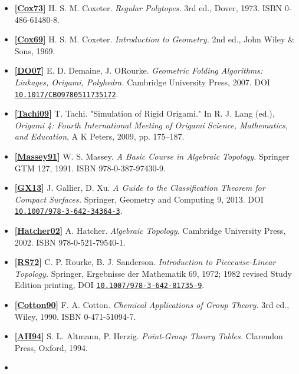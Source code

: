\documentclass[
  11pt,
  a4paper,
]{article}
\providecommand{\tightlist}{%
  \setlength{\itemsep}{0pt}\setlength{\parskip}{0pt}}
\newcommand{\paperdoi}[1]{\begingroup\urlstyle{same}\href{https://doi.org/#1}{\nolinkurl{#1}}\endgroup}
\begin{document}
\begin{itemize}
\tightlist
\item
  \hypertarget{ref-Cox73}{}\textbf{{[}\hyperlink{ref-Cox73}{Cox73}{]}} H. S. M. Coxeter. \emph{Regular Polytopes.} 3rd ed., Dover, 1973. ISBN 0-486-61480-8.
\item
  \hypertarget{ref-Cox69}{}\textbf{{[}\hyperlink{ref-Cox69}{Cox69}{]}} H. S. M. Coxeter. \emph{Introduction to Geometry.} 2nd ed., John Wiley \& Sons, 1969.
\item
  \hypertarget{ref-DO07}{}\textbf{{[}\hyperlink{ref-DO07}{DO07}{]}} E. D. Demaine, J. O\textquotesingle Rourke. \emph{Geometric Folding Algorithms: Linkages, Origami, Polyhedra.} Cambridge University Press, 2007. DOI \paperdoi{10.1017/CBO9780511735172}.
\item
  \hypertarget{ref-Tachi09}{}\textbf{{[}\hyperlink{ref-Tachi09}{Tachi09}{]}} T. Tachi. "Simulation of Rigid Origami." In R. J. Lang (ed.), \emph{Origami 4: Fourth International Meeting of Origami Science, Mathematics, and Education}, A K Peters, 2009, pp. 175--187.
\item
  \hypertarget{ref-Massey91}{}\textbf{{[}\hyperlink{ref-Massey91}{Massey91}{]}} W. S. Massey. \emph{A Basic Course in Algebraic Topology.} Springer GTM 127, 1991. ISBN 978-0-387-97430-9.
\item
  \hypertarget{ref-GX13}{}\textbf{{[}\hyperlink{ref-GX13}{GX13}{]}} J. Gallier, D. Xu. \emph{A Guide to the Classification Theorem for Compact Surfaces.} Springer, Geometry and Computing 9, 2013. DOI \paperdoi{10.1007/978-3-642-34364-3}.
\item
  \hypertarget{ref-Hatcher02}{}\textbf{{[}\hyperlink{ref-Hatcher02}{Hatcher02}{]}} A. Hatcher. \emph{Algebraic Topology.} Cambridge University Press, 2002. ISBN 978-0-521-79540-1.
\item
  \hypertarget{ref-RS72}{}\textbf{{[}\hyperlink{ref-RS72}{RS72}{]}} C. P. Rourke, B. J. Sanderson. \emph{Introduction to Piecewise-Linear Topology.} Springer, Ergebnisse der Mathematik 69, 1972; 1982 revised Study Edition printing, DOI \paperdoi{10.1007/978-3-642-81735-9}.
\item
  \hypertarget{ref-Cotton90}{}\textbf{{[}\hyperlink{ref-Cotton90}{Cotton90}{]}} F. A. Cotton. \emph{Chemical Applications of Group Theory.} 3rd ed., Wiley, 1990. ISBN 0-471-51094-7.
\item
  \hypertarget{ref-AH94}{}\textbf{{[}\hyperlink{ref-AH94}{AH94}{]}} S. L. Altmann, P. Herzig. \emph{Point-Group Theory Tables.} Clarendon Press, Oxford, 1994.
\item

\end{itemize}
\end{document}
